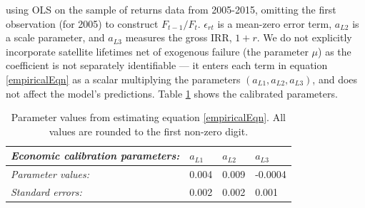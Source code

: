 \documentclass[9pt,twoside,lineno]{pnas-new}
\begin{document}
using OLS on the sample of returns data from 2005-2015, omitting the first observation (for 2005) to construct $F_{t-1}/F_{t}$. $\epsilon_{rt}$ is a mean-zero error term, $a_{L 2}$ is a scale parameter, and $a_{L 3}$ measures the gross IRR, $1+r$. We do not explicitly incorporate satellite lifetimes net of exogenous failure (the parameter $\mu$) as the coefficient is not separately identifiable --- it enters each term in equation \ref{empiricalEqn} as a scalar multiplying the parameters $(a_{L1},a_{L2},a_{L3})$, and does not affect the model's predictions. Table \ref{econParms} shows the calibrated parameters.\\ %

\begin{table}[H]
	\centering
	\begin{tabular}{|l|l|l|l|}
		\hline
		\textit{Economic calibration parameters:}      & \textbf{$a_{L 1}$} & \textbf{$a_{L 2}$} & \textbf{$a_{L 3}$} \\ \hline
		\textit{Parameter values:} & 0.004               & 0.009               & -0.0004 \\ \hline
		\textit{Standard errors:} & 0.002 & 0.002 & 0.001 \\ \hline
	\end{tabular}
	\caption[Parameter values from estimating equation \ref{empiricalEqn}]{Parameter values from estimating equation \ref{empiricalEqn}. All values are rounded to the first non-zero digit.}
	\label{econParms}
\end{table}
\end{document}
